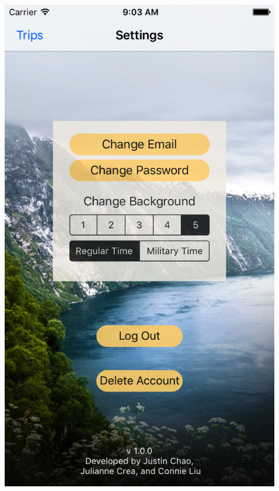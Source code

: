 \documentclass{beamer}
\begin{document}
\begin{frame}
\begin{columns}
\begin{column}{0.3\textwidth}
\begin{center}
        \end{center}
    \end{column}
    \begin{column}{0.3\textwidth}  %
        \begin{center}
            \includegraphics[scale=0.14]{settings2}
        \end{center}
    \end{column}
    \begin{column}{0.3\textwidth}  %

\end{column}
\end{columns}
\end{frame}
\end{document}
